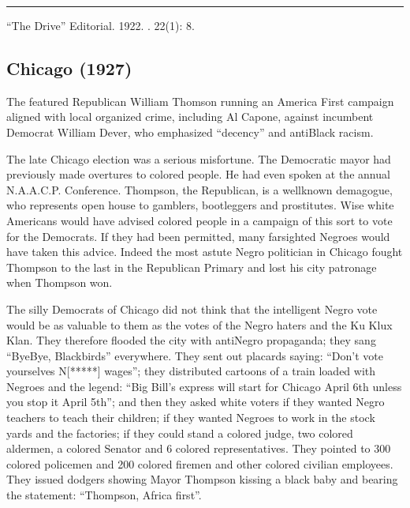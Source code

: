 \documentclass[letterpaper,10pt,english]{jupyterBook}
\begin{document}
\bigskip\hrule\bigskip


\sphinxAtStartPar
{} “The Drive” Editorial. 1922. . 22(1): 8.


\subsection{Chicago (1927)}
\label{\detokenize{Volumes/34/04/chicago:chicago-1927}}\label{\detokenize{Volumes/34/04/chicago::doc}}
\begin{sphinxShadowBox}
\sphinxstylesidebartitle{}

\sphinxAtStartPar
The  featured Republican William Thomson running an America First campaign aligned with local organized crime, including Al Capone, against incumbent Democrat William Dever, who emphasized “decency” and anti\sphinxhyphen{}Black racism.
\end{sphinxShadowBox}

\sphinxAtStartPar
The late Chicago election was a serious misfortune. The Democratic mayor had previously made overtures to colored people. He had even spoken at the annual N.A.A.C.P. Conference. Thompson, the Republican, is a well\sphinxhyphen{}known demagogue, who represents open house to gamblers, bootleggers and prostitutes. Wise white Americans would have advised colored people in a campaign of this sort to vote for the Democrats. If they had been permitted, many far\sphinxhyphen{}sighted Negroes would have taken this advice. Indeed the most astute Negro politician in Chicago fought Thompson to the last in the Republican Primary and lost his city patronage when Thompson won.

\sphinxAtStartPar
The silly Democrats of Chicago did not think that the intelligent Negro vote would be as valuable to them as the votes of the Negro haters and the Ku Klux Klan. They therefore flooded the city with anti\sphinxhyphen{}Negro propaganda; they sang “Bye\sphinxhyphen{}Bye, Blackbirds” everywhere. They sent out placards saying: “Don’t vote yourselves N{[}*****{]} wages”; they distributed cartoons of a train loaded with Negroes and the legend: “Big Bill’s express will start for Chicago April 6th unless you stop it April 5th”; and then they asked white voters if they wanted Negro teachers to teach their children; if they wanted Negroes to work in the stock yards and the factories; if they could stand a colored judge, two colored aldermen, a colored Senator and 6 colored representatives. They pointed to 300 colored policemen and 200 colored firemen and other colored civilian employees. They issued dodgers showing Mayor Thompson kissing a black baby and bearing the statement: “Thompson, Africa first”.
\end{document}
